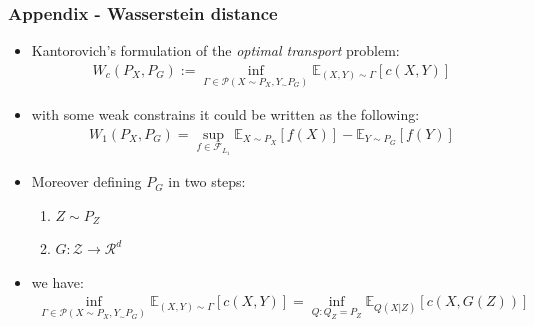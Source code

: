 \documentclass{beamer}
\begin{document}
\begin{frame}
\frametitle{Appendix - Wasserstein distance}
\begin{itemize}
  \item Kantorovich's formulation of the \textit{optimal transport} problem:
  \begin{align*}
    W_c(P_X,P_G) := \inf_{\Gamma \in \mathcal{P} (X\sim P_X,Y_\sim P_G)}
    \mathbb{E}_{(X, Y)\sim \Gamma}\left[ c(X, Y) \right]
  \end{align*}
  \item with some weak constrains it could be written as the following:
  \begin{align*}
    W_1(P_X,P_G) = \sup_{f \in \mathcal{F}_{L_1}}
    \mathbb{E}_{X \sim P_X} \left[ f(X) \right] - \mathbb{E}_{Y \sim P_G} \left[ f(Y) \right]
  \end{align*}
  \item Moreover defining $P_G$ in two steps:
    \begin{enumerate}
      \item $Z \sim P_Z$
      \item $G: \mathcal{Z} \rightarrow \mathcal{R}^d$
    \end{enumerate}
  \item we have:
  \begin{align*}
    \inf_{\Gamma \in \mathcal{P} (X\sim P_X,Y_\sim P_G)}
    \mathbb{E}_{(X, Y)\sim \Gamma}\left[ c(X, Y) \right] =
    \inf_{Q:Q_Z=P_Z} \mathbb{E}_{Q(X|Z)} \left[ c(X, G(Z)) \right]
  \end{align*}
\end{itemize}
\end{frame}
\end{document}
